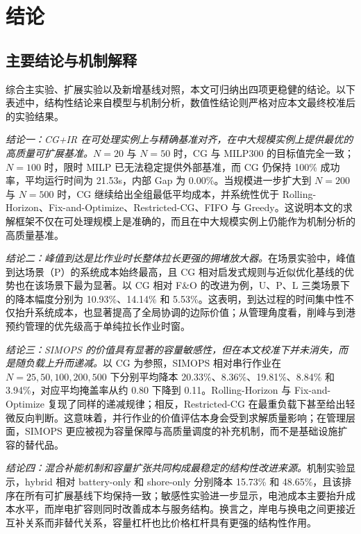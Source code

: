 \documentclass[UTF8, a4paper, 12pt]{ctexart}
\theoremstyle{plain}
\theoremstyle{definition}
\theoremstyle{remark}
\begin{document}

\section{结论}
\label{sec:conclusion}

\subsection{主要结论与机制解释}
\label{sec:main_findings}

综合主实验、扩展实验以及新增基线对照，本文可归纳出四项更稳健的结论。以下表述中，结构性结论来自模型与机制分析，数值性结论则严格对应本文最终校准后的实验结果。

\emph{结论一：CG+IR 在可处理实例上与精确基准对齐，在中大规模实例上提供最优的高质量可扩展基准。}$N=20$ 与 $N=50$ 时，CG 与 MILP300 的目标值完全一致；$N=100$ 时，限时 MILP 已无法稳定提供外部基准，而 CG 仍保持 100\% 成功率，平均运行时间为 21.53s，内部 Gap 为 0.00\%。当规模进一步扩大到 $N=200$ 与 $N=500$ 时，CG 继续给出全组最低平均成本，并系统性优于 Rolling-Horizon、Fix-and-Optimize、Restricted-CG、FIFO 与 Greedy。这说明本文的求解框架不仅在可处理规模上是准确的，而且在中大规模实例上仍能作为机制分析的高质量基准。

\emph{结论二：峰值到达是比作业时长整体拉长更强的拥堵放大器。}在场景实验中，峰值到达场景（P）的系统成本始终最高，且 CG 相对启发式规则与近似优化基线的优势也在该场景下最为显著。以 CG 相对 F\&O 的改进为例，U、P、L 三类场景下的降本幅度分别为 10.93\%、14.14\% 和 5.53\%。这表明，到达过程的时间集中性不仅抬升系统成本，也显著提高了全局协调的边际价值；从管理角度看，削峰与到港预约管理的优先级高于单纯拉长作业时窗。

\emph{结论三：SIMOPS 的价值具有显著的容量敏感性，但在本文校准下并未消失，而是随负载上升而递减。}以 CG 为参照，SIMOPS 相对串行作业在 $N=25,50,100,200,500$ 下分别平均降本 20.33\%、8.36\%、19.81\%、8.84\% 和 3.94\%，对应平均掩盖率从约 0.80 下降到 0.11。Rolling-Horizon 与 Fix-and-Optimize 复现了同样的递减规律；相反，Restricted-CG 在最重负载下甚至给出轻微反向判断。这意味着，并行作业的价值评估本身会受到求解质量影响；在管理层面，SIMOPS 更应被视为容量保障与高质量调度的补充机制，而不是基础设施扩容的替代品。

\emph{结论四：混合补能机制和容量扩张共同构成最稳定的结构性改进来源。}机制实验显示，hybrid 相对 battery-only 和 shore-only 分别降本 15.73\% 和 48.65\%，且该排序在所有可扩展基线下均保持一致；敏感性实验进一步显示，电池成本主要抬升成本水平，而岸电扩容则同时改善成本与服务结构。换言之，岸电与换电之间更接近互补关系而非替代关系，容量杠杆也比价格杠杆具有更强的结构性作用。
\end{document}

